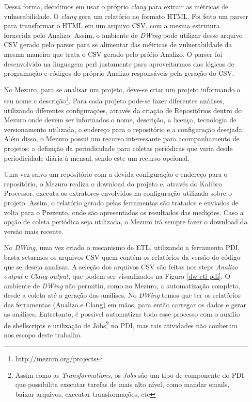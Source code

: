Dessa forma, decidimos em usar o próprio  \emph{clang} para extrair as métricas de vulnerabilidade. O \emph{clang} gera um relatório no formato HTML. Foi feito um parser para transformar o HTML em um arquivo CSV, com a mesma estrutura fornecida pelo Analizo. Assim, o ambiente de \emph{DWing} pode utilizar desse arquivo CSV gerado pelo parser para se alimentar das métricas de vulnerabildade da mesma maneira que trata o CSV gerado pelo próŕio Analizo. O parser foi desenvolvido na linguagem perl justamente para aproveitarmos das lógicas de programação e códigos do próprio Analizo responsáveis pela geração do CSV.

No Mezuro, para se analisar um projeto, deve-se criar um projeto informando o seu nome e descrição\footnote{\url{http://mezuro.org/projects}}. Para cada projeto pode-se fazer diferentes análises, utilizando diferentes configurações, através da criação de Repositórios dentro do Mezuro onde devem ser informados o nome, descrição, a licença, tecnologia de versionamento utilizada, o endereço para o repositório e a configuração desejada. Além disso, o Mezuro possui um recurso interessante para acompanhamento de projetos: a definição da periodicidade para coletas periódicas que varia desde periodicidade diária à mensal, sendo este um recurso opcional.

Uma vez salvo um repositório com a devida configuração e endereço para o repositório, o Mezuro realiza o download do projeto e, através do Kalibro Processor, executa os extratores envolvidos na configuração utilizada sobre o projeto. Assim, o relatório gerado pelas ferramentas são tratados e enviados de volta para o Prezento, onde são apresentados os resultados das medições. Caso a opção de coleta periódica seja utilizada, o Mezuro irá sempre fazer o download da versão mais recente.


No \emph{DWing}, uma vez criado o mecanismo de ETL, utilizando a ferramenta PDI, basta setarmos os arquivos  CSV  quem contém os relatórios da versão do código que se deseja analisar. A seleção dos arquivos CSV são feitas nos steps \emph{Analizo output} e \emph{Clang output}, que podem ser visualizados na Figura \ref{dw-etl-pdi}. O ambiente de \emph{DWing} não permitiu, como no Mezuro, a automatização completa, desde a coleta até a geração das análises. No \emph{DWing} temos que ter os relatórios das ferramentas (Analizo e Clang) em mãos, para então carregar os dados e gerar as análises. Entretanto, é possível automatizar todo esse processo com o auxílio de shellscripts e utilização de Jobs\footnote{Assim como as \emph{Transformations}, os \emph{Jobs} são um tipo de componente do PDI que possibilita executar tarefas de mais alto nível, como mandar emails, baixar arquivos, executar transformações, etc} no PDI, mas tais atividades não couberam nos escopo deste trabalho.


